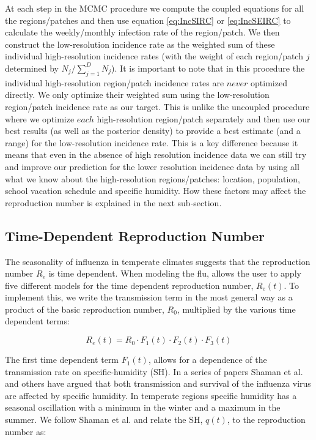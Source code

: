 \documentclass[a4paper]{article}
\begin{document}
At each step in the MCMC procedure we compute the coupled equations for all the regions/patches and then use equation \eqref{eq:IncSIRC} or \eqref{eq:IncSEIRC} to calculate the weekly/monthly infection rate of the region/patch.  We then construct the low-resolution incidence rate as the weighted sum of these individual high-resolution incidence rates (with the weight of each region/patch $j$ determined by $N_j/\sum_{j=1}^{D}{N_j}$). It is important to note that in this procedure the individual high-resolution region/patch incidence rates are $never$ optimized directly. We only optimize their weighted sum using the low-resolution region/patch incidence rate as our target.  This is unlike the uncoupled procedure where we optimize $each$ high-resolution region/patch separately and then use our best results (as well as the posterior density) to provide a best estimate (and a range) for the low-resolution incidence rate.  This is a key difference because it means that even in the absence of high resolution incidence data we can still try and improve our prediction for the lower resolution incidence data by using all what we know about the high-resolution regions/patches: location, population, school vacation schedule and specific humidity.   How these factors may affect the reproduction number is explained in the next sub-section.


\subsection{Time-Dependent Reproduction Number}
\label{sssec:TimeDependentR}
The seasonality of influenza in temperate climates suggests that the reproduction number $R_e$ is time dependent.
When modeling the flu,  allows the user to apply five different models for the time dependent reproduction number, $R_e(t)$.  To implement this, we write the transmission term in the most general way as a product of the basic reproduction number, $R_{0}$, multiplied by the various time dependent terms:

 \begin{equation}
 R_{e}(t)=R_{0} \cdot {F_1(t)}\cdot{F_2(t)} \cdot {F_3(t)}
 \end{equation}

The first time dependent term $F_1(t)$, allows for a dependence of the transmission rate on specific-humidity (SH). In a series of papers \cite{shaman2009absolute,shaman2010absolute,shaman2011absolute} Shaman et al. and others \cite{lowen2007influenza,barreca2012absolute} have argued that both transmission and survival of the influenza virus are affected by specific humidity.  In temperate regions specific humidity has a seasonal oscillation with a minimum in the winter and a maximum in the summer.  We follow Shaman et al. \cite{shaman2010absolute} and relate the SH, $q(t)$, to the reproduction number as:
\end{document}
